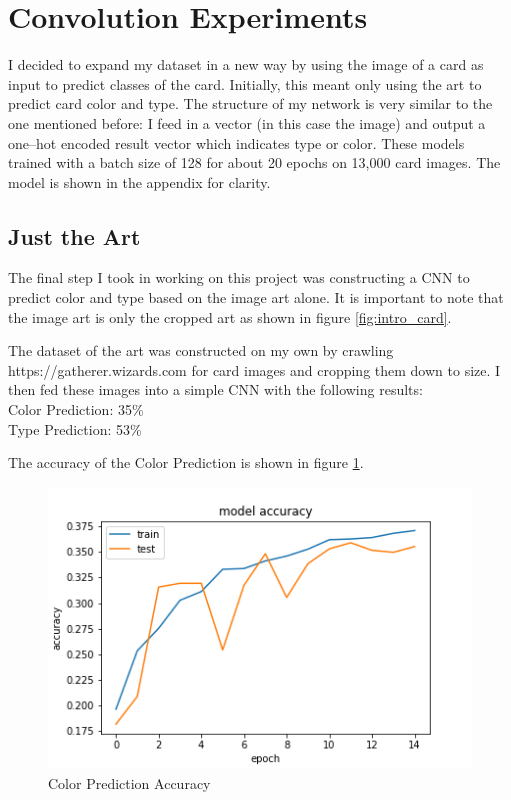 \section{Convolution Experiments}
\label{cnn_predicts}

I decided to expand my dataset in a new way by 
using the image of a card as input to predict classes
of the card. Initially, this meant only using the art
to predict card color and type. The structure of my
network is very similar to the one mentioned before:
I feed in a vector (in this case the image) and output
a one--hot encoded result vector which indicates type
or color. These models trained with a batch size of 128
for about 20 epochs on 13,000 card images. The model
is shown in the appendix for clarity.

\subsection{Just the Art}
The final step I took in working on this project
was constructing a CNN to predict color and type
based on the image art alone. It is important to 
note that the image art is only the cropped art
as shown in figure \ref{fig:intro_card}.

The dataset of the art was constructed on my own
by crawling https://gatherer.wizards.com for card 
images and cropping them down to size\cite{gatherer}.
I then fed these images into a simple CNN with the 
following results:\\
Color Prediction: 35\%\\
Type Prediction: 53\%

The accuracy of the Color Prediction is shown in figure \ref{fig:cnn_results}.

\begin{figure}[h!]
    \centering
    \includegraphics[width=0.8\linewidth]{figures/cnn_results.png} 
    \caption{Color Prediction Accuracy}
    \label{fig:cnn_results}
\end{figure}

